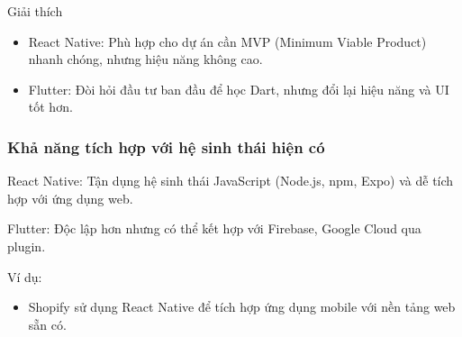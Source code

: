 \begin{flushleft}
        \begin{flushleft}
          \hspace*{0.8cm}Giải thích
          \setlength{\leftmargini}{1.5cm}
          \begin{itemize}
              \item React Native: Phù hợp cho dự án cần MVP (Minimum Viable Product) nhanh chóng, nhưng hiệu năng không cao.
              \item Flutter: Đòi hỏi đầu tư ban đầu để học Dart, nhưng đổi lại hiệu năng và UI tốt hơn.
          \end{itemize}
        \end{flushleft}

        \subsubsection{Khả năng tích hợp với hệ sinh thái hiện có}
        \begin{flushleft}
          \hspace*{0.8cm}React Native: Tận dụng hệ sinh thái JavaScript (Node.js, npm, Expo) và dễ tích hợp với ứng dụng web.
        \end{flushleft}

        \begin{flushleft}
          \hspace*{0.8cm}Flutter: Độc lập hơn nhưng có thể kết hợp với Firebase, Google Cloud qua plugin.
        \end{flushleft}

        \begin{flushleft}
          \hspace*{0.8cm}Ví dụ:
          \setlength{\leftmargini}{1.5cm}
          \begin{itemize}
              \item Shopify sử dụng React Native để tích hợp ứng dụng mobile với nền tảng web sẵn có.
          \end{itemize}
        \end{flushleft}
    \end{flushleft}

